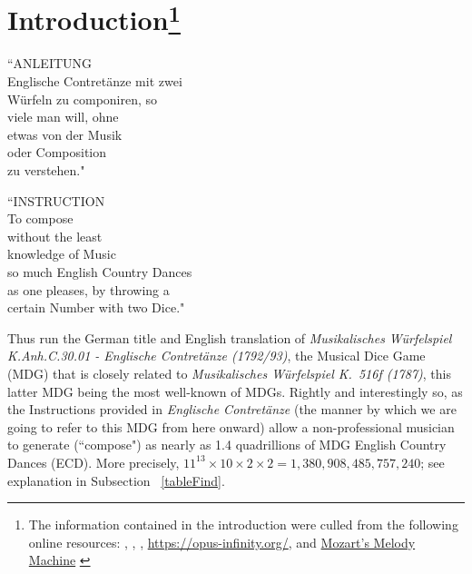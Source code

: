 \documentclass[letterpaper,x11names,svgnames,10pt]{article}
\begin{document}
\section[Introduction]{Introduction\footnote{The information contained in the introduction were culled from the following online resources:
	\citet{wiki_mw2017}, \citet{wam92}, \citet{kv2024}, 
	\url{https://opus-infinity.org/}, and 
	\href{https://www.sciencenews.org/article/mozarts-melody-machine-0}{Mozart's Melody Machine} \citep*{peterson2001}
	}
}
	\begin{center}
	\begin{minipage}{0.4\textwidth}
	\begin{flushleft}
		\begin{center}
			``ANLEITUNG\\
			Englische Contret\"{a}nze mit zwei\\
			W\"{u}rfeln zu componiren, so\\
			viele man will, ohne\\
			etwas von der Musik\\
			oder Composition\\
			zu verstehen."\\
		\end{center}
	\end{flushleft}
	\end{minipage}
	\begin{minipage}{0.4\textwidth}
	\begin{flushright}
		\begin{center}
		``INSTRUCTION\\
		To compose \\
		without the least \\ 
		knowledge of Music \\ 
		so much English Country Dances \\
		as one pleases, by throwing a \\
		certain Number with two Dice."
	\end{center}
	\end{flushright}
	\end{minipage}
	\end{center}

Thus run the German title and English translation of {\it Musikalisches W\"{u}rfelspiel K.Anh.C.30.01 - Englische Contret\"{a}nze (1792/93)}, the Musical Dice Game (MDG) that is closely related to {\it Musikalisches W\"{u}rfelspiel K.\ 516f (1787)}, this latter MDG being the most well-known of MDGs.  Rightly and interestingly so, as the Instructions provided in {\it Englische Contret\"{a}nze} (the manner by which we are going to refer to this MDG from here onward) allow a non-professional musician to generate (``compose") as nearly as 1.4 quadrillions of MDG English Country Dances (ECD).  More precisely, $11^{13}\times 10 \times 2\times 2 = 1\!,380\!,908\!,485\!,757\!,240$; see explanation in Subsection ~\ref{tableFind}.\\  
\end{document}
